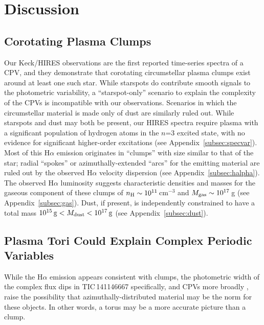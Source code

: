 \documentclass[11pt,twocolumn,tighten,linenumbers]{aastex7}
\begin{document}
\section{Discussion}
\label{sec:disc}

\subsection{Corotating Plasma Clumps}

Our Keck/HIRES observations are the first reported time-series spectra
of a CPV, and they demonstrate that corotating circumstellar plasma
clumps exist around at least one such star.  While starspots do
contribute smooth signals to the photometric variability, a
``starspot-only'' scenario to explain the complexity of the CPVs
\citep{Koen2021} is incompatible with our observations.  Scenarios in
which the circumstellar material is made only of dust are similarly
ruled out.  While starspots and dust may both be present, our HIRES
spectra require plasma with a significant population of hydrogen atoms
in the $n$=3 excited state, with no evidence for significant
higher-order excitations (see Appendix~\ref{subsec:specvar}).  Most of
this H$\alpha$ emission originates in ``clumps'' with size similar to
that of the star; radial ``spokes'' or azimuthally-extended ``arcs''
for the emitting material are ruled out by the observed H$\alpha$
velocity dispersion (see Appendix~\ref{subsec:halpha}).  The observed
H$\alpha$ luminosity suggests characteristic densities and masses for
the gaseous component of these clumps of $n_{\rm H} \sim
10^{11}$\,cm$^{-3}$ and $M_{\rm gas} \sim 10^{17}$\,g (see
Appendix~\ref{subsec:gas}).  Dust, if present, is independently
constrained to have a total mass $10^{15}\,{\rm g} < M_{\rm dust} <
10^{17}\,{\rm g}$ (see Appendix~\ref{subsec:dust}).  


\subsection{Plasma Tori Could Explain Complex Periodic Variables}

While the H$\alpha$ emission appears consistent with clumps, the
photometric width of the complex flux dips in TIC\,141146667
specifically, and CPVs more broadly \citep[Figure~4 of][]{Bouma2024},
raise the possibility that azimuthally-distributed material may be the
norm for these objects.  In other words, a torus may be a more
accurate picture than a clump.
\end{document}
